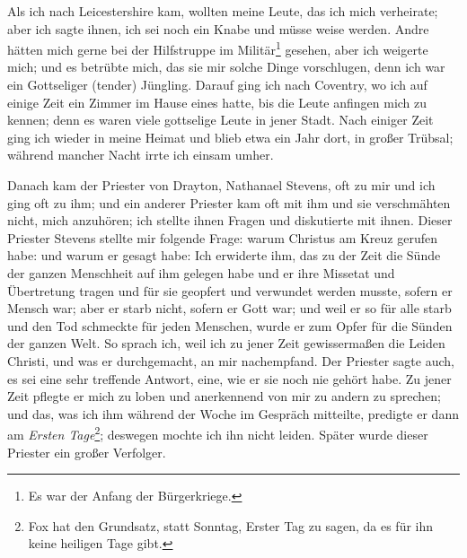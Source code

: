 Als ich nach Leicestershire kam, wollten meine Leute, das ich
mich verheirate; aber ich sagte ihnen, 
ich sei noch ein Knabe und
müsse weise werden. Andre hätten mich gerne bei der Hilfstruppe
im Militär\footnote{Es war der Anfang der Bürgerkriege.}
gesehen, aber ich weigerte mich; und es betrübte mich,
das sie mir solche Dinge vorschlugen, denn ich war ein Gottseliger
(tender) Jüngling. Darauf ging ich nach Coventry, wo ich auf
einige Zeit ein Zimmer im Hause eines  hatte, bis
die Leute anfingen mich zu kennen; denn es waren viele gottselige 
Leute in jener Stadt. Nach einiger Zeit ging ich wieder
in meine Heimat und blieb etwa ein Jahr dort, in großer Trübsal; 
während mancher Nacht irrte ich einsam umher.

Danach kam der Priester von Drayton, Nathanael 
Stevens,
oft zu mir und ich ging oft zu ihm; und ein anderer Priester
kam oft mit ihm und sie verschmähten nicht, mich anzuhören; ich
stellte ihnen Fragen und diskutierte mit ihnen. Dieser Priester
Stevens stellte mir folgende Frage: warum Christus am Kreuz
gerufen habe:  
und warum er gesagt habe:  Ich erwiderte ihm, das zu der Zeit die Sünde der
ganzen Menschheit auf ihm gelegen habe und er ihre Missetat
und Übertretung tragen und für sie geopfert und verwundet
werden musste, sofern er Mensch war; aber er starb nicht, sofern
er Gott war; und weil er so für alle starb und den Tod schmeckte
für jeden Menschen, wurde er zum Opfer 
für die Sünden der
ganzen Welt. So sprach ich, weil ich zu jener Zeit gewissermaßen 
die Leiden Christi, und was er durchgemacht, an mir
nachempfand. Der Priester sagte auch, es sei eine sehr treffende
Antwort, eine, wie er sie noch nie gehört habe. Zu jener Zeit
pflegte er mich zu loben und anerkennend von mir zu andern zu
sprechen; und das, was ich ihm während der Woche im Gespräch
mitteilte, predigte er dann am \textit{Ersten Tage}\footnote{Fox 
hat den Grundsatz, statt Sonntag, Erster Tag zu sagen, da es für
ihn keine heiligen Tage gibt.}; deswegen mochte
ich ihn nicht leiden. Später wurde dieser Priester ein großer
Verfolger.

